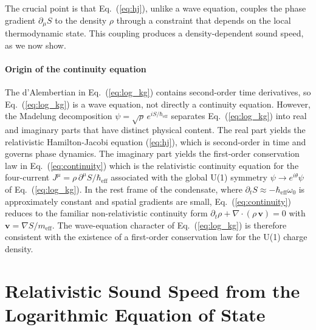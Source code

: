 \documentclass[12pt, a4paper]{article}
\begin{document}
The crucial point is that Eq.~(\ref{eq:hj}), unlike a wave equation, couples the phase gradient $\partial_\mu S$ to the density $\rho$ through a constraint that depends on the local thermodynamic state. This coupling produces a density-dependent sound speed, as we now show.

\paragraph{Origin of the continuity equation}
The d'Alembertian in Eq.~(\ref{eq:log_kg}) contains second-order time derivatives, so Eq.~(\ref{eq:log_kg}) is a wave equation, not directly a continuity equation. However, the Madelung decomposition $\psi = \sqrt{\rho}\,e^{iS/\hbar_{\mathrm{eff}}}$ separates Eq.~(\ref{eq:log_kg}) into real and imaginary parts that have distinct physical content. The real part yields the relativistic Hamilton-Jacobi equation (\ref{eq:hj}), which is second-order in time and governs phase dynamics. The imaginary part yields the first-order conservation law in Eq.~(\ref{eq:continuity}) which is the relativistic continuity equation for the four-current $J^\mu = \rho\,\partial^\mu S/\hbar_{\mathrm{eff}}$ associated with the global U(1) symmetry $\psi \to e^{i\theta}\psi$ of Eq.~(\ref{eq:log_kg}). In the rest frame of the condensate, where $\partial_t S \approx -\hbar_{\mathrm{eff}}\omega_0$ is approximately constant and spatial gradients are small, Eq.~(\ref{eq:continuity}) reduces to the familiar non-relativistic continuity form $\partial_t \rho + \nabla\cdot(\rho\,\mathbf{v}) = 0$ with $\mathbf{v} = \nabla S/m_{\mathrm{eff}}$. The wave-equation character of Eq.~(\ref{eq:log_kg}) is therefore consistent with the existence of a first-order conservation law for the U(1) charge density.


\section{Relativistic Sound Speed from the Logarithmic Equation of State}
\label{sec:sound_speed}
\end{document}
